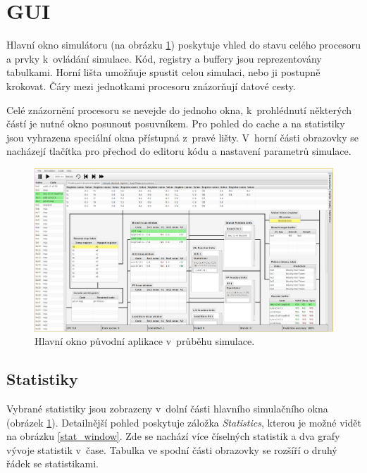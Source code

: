 \section{GUI}

Hlavní okno simulátoru (na obrázku \ref{old_gui}) poskytuje vhled do stavu celého procesoru a prvky k~ovládání simulace.
Kód, registry a buffery jsou reprezentovány tabulkami.
Horní lišta umožňuje spustit celou simulaci, nebo ji postupně krokovat.
Čáry mezi jednotkami procesoru znázorňují datové cesty.

Celé znázornění procesoru se nevejde do jednoho okna, k~prohlédnutí některých částí je nutné okno posunout posuvníkem.
Pro pohled do cache a na statistiky jsou vyhrazena speciální okna přístupná z~pravé lišty.
V~horní části obrazovky se nacházejí tlačítka pro přechod do editoru kódu a nastavení parametrů simulace.

\begin{figure}[hbtp]
    \includegraphics[width=\textwidth]{obrazky-figures/simulating.png}
    \caption{Hlavní okno původní aplikace v~průběhu simulace. \cite{horkySim, vavraSim}}
    \label{old_gui}
\end{figure}

\subsection{Statistiky}

Vybrané statistiky jsou zobrazeny v~dolní části hlavního simulačního okna (obrázek \ref{old_gui}).
Detailnější pohled poskytuje záložka \emph{Statistics}, kterou je možné vidět na obrázku \ref{stat_window}.
Zde se nachází více číselných statistik a dva grafy vývoje statistik v~čase.
Tabulka ve spodní části obrazovky se rozšíří o druhý řádek se statistikami.

